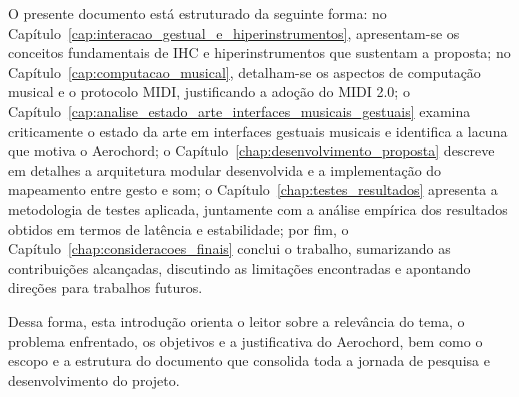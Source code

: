 O presente documento está estruturado da seguinte forma: no Capítulo~\ref{cap:interacao_gestual_e_hiperinstrumentos}, apresentam-se os conceitos fundamentais de IHC e hiperinstrumentos que sustentam a proposta; no Capítulo~\ref{cap:computacao_musical}, detalham-se os aspectos de computação musical e o protocolo MIDI, justificando a adoção do MIDI 2.0; o Capítulo~\ref{cap:analise_estado_arte_interfaces_musicais_gestuais} examina criticamente o estado da arte em interfaces gestuais musicais e identifica a lacuna que motiva o Aerochord; o Capítulo~\ref{chap:desenvolvimento_proposta} descreve em detalhes a arquitetura modular desenvolvida e a implementação do mapeamento entre gesto e som; o Capítulo~\ref{chap:testes_resultados} apresenta a metodologia de testes aplicada, juntamente com a análise empírica dos resultados obtidos em termos de latência e estabilidade; por fim, o Capítulo~\ref{chap:consideracoes_finais} conclui o trabalho, sumarizando as contribuições alcançadas, discutindo as limitações encontradas e apontando direções para trabalhos futuros.

Dessa forma, esta introdução orienta o leitor sobre a relevância do tema, o problema enfrentado, os objetivos e a justificativa do Aerochord, bem como o escopo e a estrutura do documento que consolida toda a jornada de pesquisa e desenvolvimento do projeto.